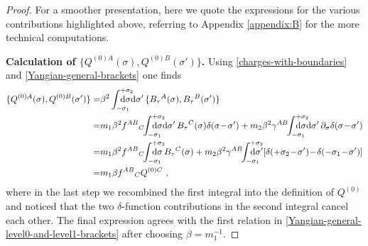 \documentclass[12pt]{article}
\numberwithin{equation}{section}
\begin{document}
\begin{proof} For a smoother presentation, here we quote the expressions for the various contributions highlighted above, referring to Appendix \ref{appendix:B} for the more technical computations.

\textbf{Calculation of $\{Q^{(0)A}(\sigma),Q^{(0)B}(\sigma')\}$.} \quad Using \eqref{charges-with-boundaries} and \eqref{Yangian-general-brackets} one finds
\begin{align}
\{Q^{(0)A}(\sigma),Q^{(0)B}(\sigma')\}=&\beta^2\int_{-\sigma_{1}}^{+\sigma_{2}}\!\!\!\!\!\!\!\!\!\!\mathrm{d}\sigma\mathrm{d}\sigma' \, \{ B_{\tau}{}^{A}(\sigma),B_{\tau}{}^{B}(\sigma') \}
\notag\\
=& m_{1}\beta^2 f^{AB}{}_{C} \!\!\int_{-\sigma_{1}}^{+\sigma_{2}}\!\!\!\!\!\!\!\!\!\!\mathrm{d}\sigma\mathrm{d}\sigma' \, B_{\tau}{}^{C}(\sigma)\delta(\sigma\!-\!\sigma')+m_{2}\beta^2\gamma^{AB}\!\!\int_{-\sigma_{1}}^{+\sigma_{2}}\!\!\!\!\!\!\!\!\!\!\mathrm{d}\sigma\mathrm{d}\sigma' \,\partial_{\sigma}\delta(\sigma\!-\!\sigma')
\notag\\
=&m_{1}\beta^2 f^{AB}{}_{C}\!\!\int_{-\sigma_{1}}^{+\sigma_{2}}\!\!\!\!\!\!\!\!\!\!\mathrm{d}\sigma \, B_{\tau}{}^{C}(\sigma)+m_{2}\beta^2\gamma^{AB}\!\!\int_{-\sigma_{1}}^{+\sigma_{2}}\!\!\!\!\!\!\!\!\!\!\mathrm{d}\sigma'[\delta(+\sigma_{2}\!-\!\sigma')\!-\!\delta(-\sigma_{1}\!-\!\sigma')]
\notag\\
=&m_{1}\beta f^{AB}{}_{C}Q^{(0)C} \,\, ,
\end{align}
where in the last step we recombined the first integral into the definition of $Q^{(0)}$ and noticed that the two $\delta$-function contributions in the second integral cancel each other. The final expression agrees with the first relation in \eqref{Yangian-general-level0-and-level1-brackets} after choosing $\beta=m_{1}^{-1}$.






\end{proof}
\end{document}
